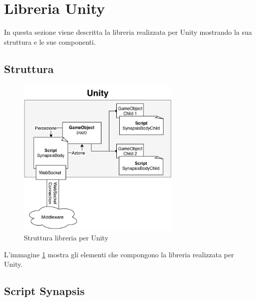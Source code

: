 \section{Libreria Unity} \label{libreria_unity}

In questa sezione viene descritta la libreria realizzata per Unity mostrando la sua struttura e le sue componenti.

\subsection{Struttura}

\begin{figure}[H]
\centering
\includegraphics[width=0.7\textwidth]{figures/struttura_libreria_unity.png}
\caption{Struttura libreria per Unity}
\label{struttura_libreria_unity}
\end{figure}

L'immagine \ref{struttura_libreria_unity} mostra gli elementi che compongono la libreria realizzata per Unity.

\subsection{Script Synapsis}

